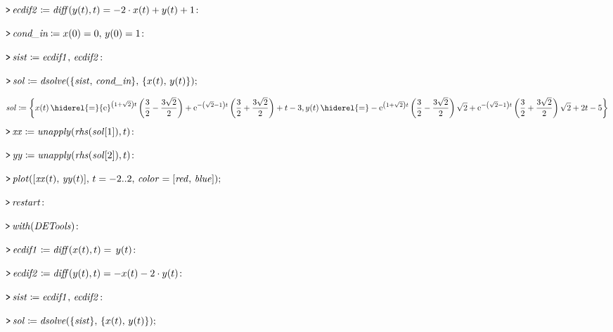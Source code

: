 \documentclass{article}
\begin{document}
\mapleinput
{$ \displaystyle \texttt{>\,} \mathit{ecdif2} \coloneqq \mathit{diff} (y (t),t)=-2\cdot x (t)+y (t)+1\colon  $}

\mapleinput
{$ \displaystyle \texttt{>\,} \textit{cond\_in} \coloneqq x (0)=0,\,y (0)=1\colon  $}

\mapleinput
{$ \displaystyle \texttt{>\,} \mathit{sist} \coloneqq \mathit{ecdif1} ,\,\mathit{ecdif2} \colon  $}

\mapleinput
{$ \displaystyle \texttt{>\,} \mathit{sol} \coloneqq \mathit{dsolve} (\{\mathit{sist} ,\,\textit{cond\_in} \},\,\{x (t),\,y (t)\}); $}

\begin{dmath}\label{(8)}
\mathit{sol} \coloneqq \left\{x \! \left(t \right) \hiderel{=} {\mathrm e}^{\left(1+\sqrt{2}\right) t} \left(\frac{3}{2}-\frac{3 \sqrt{2}}{2}\right)+{\mathrm e}^{-\left(\sqrt{2}-1\right) t} \left(\frac{3}{2}+\frac{3 \sqrt{2}}{2}\right)+t -3,
\\
y \! \left(t \right)\hiderel{=}-{\mathrm e}^{\left(1+\sqrt{2}\right) t} \left(\frac{3}{2}-\frac{3 \sqrt{2}}{2}\right) \sqrt{2}+{\mathrm e}^{-\left(\sqrt{2}-1\right) t} \left(\frac{3}{2}+\frac{3 \sqrt{2}}{2}\right) \sqrt{2}+2 t -5\right\}
\end{dmath}
\mapleinput
{$ \displaystyle \texttt{>\,} \mathit{xx} \coloneqq \mathit{unapply} (\mathit{rhs} (\mathit{sol} [1]),t)\colon  $}

\mapleinput
{$ \displaystyle \texttt{>\,} \mathit{yy} \coloneqq \mathit{unapply} (\mathit{rhs} (\mathit{sol} [2]),t)\colon  $}

\mapleinput
{$ \displaystyle \texttt{>\,} \mathit{plot} ([\mathit{xx} (t),\,\mathit{yy} (t)],\,t =-2..2,\,\mathit{color} =[\mathit{red} ,\,\mathit{blue}]); $}

{}
\mapleinput
{$ \displaystyle \texttt{>\,} \mathit{restart} \colon  $}

\mapleinput
{$ \displaystyle \texttt{>\,} \mathit{with} (\mathit{DETools})\colon  $}

\mapleinput
{$ \displaystyle \texttt{>\,} \mathit{ecdif1} \coloneqq \mathit{diff} (x (t),t)=\,y (t)\colon  $}

\mapleinput
{$ \displaystyle \texttt{>\,} \mathit{ecdif2} \coloneqq \mathit{diff} (y (t),t)=-x (t)-2\cdot y (t)\colon  $}

\mapleinput
{$ \displaystyle \texttt{>\,} \mathit{sist} \coloneqq \mathit{ecdif1} ,\,\mathit{ecdif2} \colon  $}

\mapleinput
{$ \displaystyle \texttt{>\,} \mathit{sol} \coloneqq \mathit{dsolve} (\{\mathit{sist} \},\,\{x (t),\,y (t)\}); $}
\end{document}
